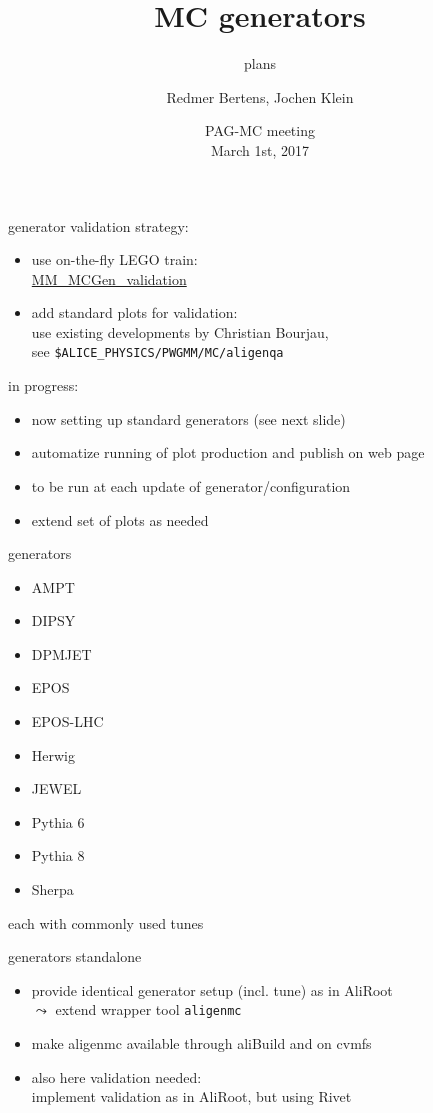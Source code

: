 \documentclass[table]{beamer}
\title{MC generators}
\subtitle{plans}
\author[Redmer, jkl]{Redmer Bertens\inst{1}, Jochen Klein\inst{2}}
\institute[]{
  \inst{1} University of Tennessee, Knoxville \and
  \inst{2} CERN, Geneva
}
\date[PAG-MC meeting, Mar 1, 2017]{
  PAG-MC meeting\\[.2cm]
  March 1st, 2017
}
\begin{document}
{
  \begin{frame}
    \titlepage
  \end{frame}
}

\begin{frame}{generator validation}
  strategy:
  \begin{itemize}
    \setlength{\itemsep}{.25cm}
  \item use on-the-fly LEGO train:\\
    \href{https://alimonitor.cern.ch/trains/train.jsp?train_id=107}{MM\_MCGen\_validation}
  \item add standard plots for validation:\\[.2cm]
    use existing developments by Christian Bourjau,\\
    see \texttt{\$ALICE\_PHYSICS/PWGMM/MC/aligenqa}
  \end{itemize}
  \vspace{.25cm}
  in progress:
  \begin{itemize}
    \setlength{\itemsep}{.25cm}
  \item now setting up standard generators (see next slide)
  \item automatize running of plot production and publish on web page
  \item to be run at each update of generator/configuration
  \item extend set of plots as needed
  \end{itemize}
\end{frame}

\begin{frame}{generators}
  \begin{itemize}
    \setlength{\itemsep}{.25cm}
  \item AMPT
  \item DIPSY
  \item DPMJET
  \item EPOS
  \item EPOS-LHC
  \item Herwig
  \item JEWEL
  \item Pythia 6
  \item Pythia 8
  \item Sherpa
  \end{itemize}
  each with commonly used tunes
\end{frame}

\begin{frame}{generators standalone}
  \begin{itemize}
    \setlength{\itemsep}{.25cm}
  \item provide identical generator setup (incl. tune) as in AliRoot\\
    $\leadsto$ extend wrapper tool \texttt{aligenmc}
  \item make aligenmc available through aliBuild and on cvmfs
  \item also here validation needed:\\
    implement validation as in AliRoot, but using Rivet
  \end{itemize}
\end{frame}
\end{document}
